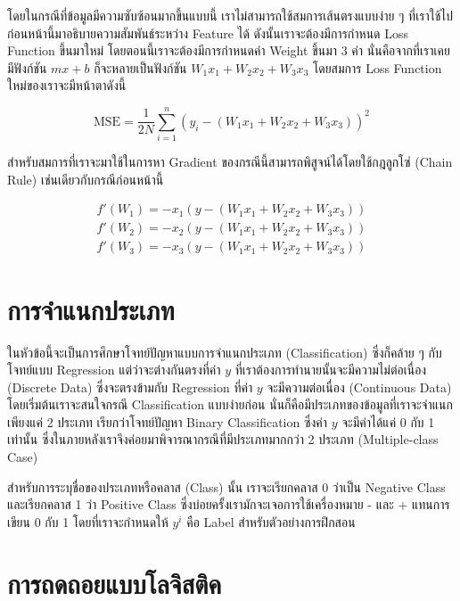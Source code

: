โดยในกรณีที่ข้อมูลมีความซับซ้อนมากขึ้นแบบนี้ เราไม่สามารถใช้สมการเส้นตรงแบบง่าย ๆ ที่เราใช้ไปก่อนหน้านี้มาอธิบายความสัมพันธ์ระหว่าง Feature
ได้ ดังนั้นเราจะต้องมีการกำหนด Loss Function ขึ้นมาใหม่ โดยตอนนี้เราจะต้องมีการกำหนดค่า Weight ขึ้นมา 3 ค่า นั่นคือจากที่เราเคยมีฟังก์ชัน 
$mx + b$ ก็จะหลายเป็นฟังก์ชัน $W_1 x_1 + W_2 x_2 + W_3 x_3$ โดยสมการ Loss Function ใหม่ของเราจะมีหน้าตาดังนี้

\begin{equation}
    \text{MSE} = \frac{1}{2N} \sum_{i=1}^{n} (y_i - (W_1 x_1 + W_2 x_2 + W_3 x_3))^2
\end{equation}

สำหรับสมการที่เราจะมาใช้ในการหา Gradient ของกรณีนี้สามารถพิสูจน์ได้โดยใช้กฎลูกโซ่ (Chain Rule) เช่นเดียวกับกรณีก่อนหน้านี้

\begin{align}
    f'(W_1) = -x_1(y - (W_1 x_1 + W_2 x_2 + W_3 x_3)) \\
    f'(W_2) = -x_2(y - (W_1 x_1 + W_2 x_2 + W_3 x_3)) \\
    f'(W_3) = -x_3(y - (W_1 x_1 + W_2 x_2 + W_3 x_3))
\end{align}

\section{การจำแนกประเภท}
\label{sec:classification}

ในหัวข้อนี้จะเป็นการศึกษาโจทย์ปัญหาแบบการจำแนกประเภท (Classification) ซึ่งก็คล้าย ๆ กับโจทย์แบบ Regression แต่ว่าจะต่างกันตรงที่ค่า
$y$ ที่เราต้องการทำนายนั้นจะมีความไม่ต่อเนื่อง (Discrete Data) ซึ่งจะตรงข้ามกับ Regression ที่ค่า $y$ จะมีความต่อเนื่อง (Continuous Data) 
โดยเริ่มต้นเราจะสนใจกรณี Classification แบบง่ายก่อน นั่นก็คือมีประเภทของข้อมูลที่เราจะจำแนกเพียงแค่ 2 ประเภท เรียกว่าโจทย์ปัญหา 
Binary Classification ซึ่งค่า $y$ จะมีค่าได้แค่ 0 กับ 1 เท่านั้น ซึ่งในภายหลังเราจึงค่อยมาพิจารณากรณีที่มีประเภทมากกว่า 2 ประเภท
(Multiple-class Case) 

สำหรับการระบุชื่อของประเภทหรือคลาส (Class) นั้น เราจะเรียกคลาส 0 ว่าเป็น Negative Class และเรียกคลาส 1 ว่า Positive Class
ซึ่งบ่อยครั้งเรามักจะเจอการใช้เครื่องหมาย - และ + แทนการเขียน 0 กับ 1 โดยที่เราจะกำหนดให้ $y^{i}$ คือ Label สำหรับตัวอย่างการฝึกสอน

\section{การถดถอยแบบโลจิสติค}
\label{sec:logis_regress}

